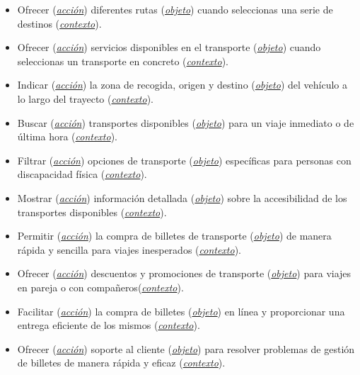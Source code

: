 \begin{itemize}
    \item Ofrecer (\textit{\underline{acción}}) diferentes rutas (\textit{\underline{objeto}}) cuando seleccionas una serie de destinos (\textit{\underline{contexto}}).
    \item Ofrecer (\textit{\underline{acción}}) servicios disponibles en el transporte (\textit{\underline{objeto}}) cuando seleccionas un transporte en concreto (\textit{\underline{contexto}}).
    \item Indicar (\textit{\underline{acción}}) la zona de recogida, origen y destino (\textit{\underline{objeto}}) del vehículo a lo largo del trayecto (\textit{\underline{contexto}}).
    \item Buscar (\textit{\underline{acción}}) transportes disponibles (\textit{\underline{objeto}}) para un viaje inmediato o de última hora (\textit{\underline{contexto}}).
    \item Filtrar (\textit{\underline{acción}}) opciones de transporte (\textit{\underline{objeto}}) específicas para personas con discapacidad física (\textit{\underline{contexto}}).
    \item Mostrar (\textit{\underline{acción}}) información detallada (\textit{\underline{objeto}}) sobre la accesibilidad de los transportes disponibles (\textit{\underline{contexto}}).
    \item Permitir (\textit{\underline{acción}}) la compra de billetes de transporte (\textit{\underline{objeto}}) de manera rápida y sencilla para viajes inesperados (\textit{\underline{contexto}}).
    \item Ofrecer (\textit{\underline{acción}}) descuentos y promociones de transporte (\textit{\underline{objeto}}) para viajes en pareja o con compañeros(\textit{\underline{contexto}}).
    \item Facilitar (\textit{\underline{acción}}) la compra de billetes (\textit{\underline{objeto}}) en línea y proporcionar una entrega eficiente de los mismos (\textit{\underline{contexto}}).
    \item Ofrecer (\textit{\underline{acción}}) soporte al cliente (\textit{\underline{objeto}}) para resolver problemas de gestión de billetes de manera rápida y eficaz (\textit{\underline{contexto}}).
\end{itemize}

